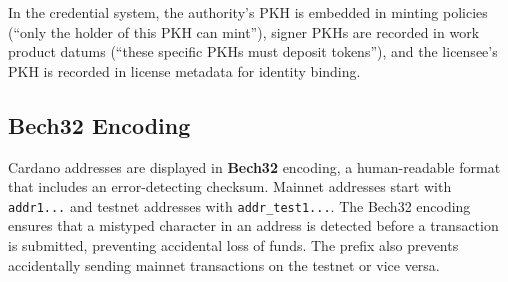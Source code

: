 In the credential system, the authority's PKH is embedded in minting
policies (``only the holder of this PKH can mint''), signer PKHs are
recorded in work product datums (``these specific PKHs must deposit
tokens''), and the licensee's PKH is recorded in license metadata for
identity binding.

\subsection{Bech32 Encoding}

Cardano addresses are displayed in \textbf{Bech32} encoding, a
human-readable format that includes an error-detecting checksum. Mainnet
addresses start with \texttt{addr1...} and testnet addresses with
\texttt{addr\_test1...}. The Bech32 encoding ensures that a mistyped
character in an address is detected before a transaction is submitted,
preventing accidental loss of funds. The prefix also prevents
accidentally sending mainnet transactions on the testnet or vice versa.

